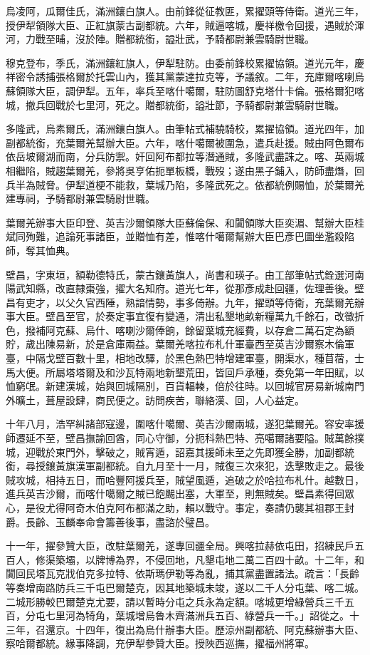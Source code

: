 \begin{pinyinscope}
烏凌阿，瓜爾佳氏，滿洲鑲白旗人。由前鋒從征教匪，累擢頭等侍衛。道光三年，授伊犁領隊大臣、正紅旗蒙古副都統。六年，賊逼喀城，慶祥檄令回援，遇賊於渾河，力戰至晡，沒於陣。贈都統銜，謚壯武，予騎都尉兼雲騎尉世職。

穆克登布，季氏，滿洲鑲紅旗人，伊犁駐防。由委前鋒校累擢協領。道光元年，慶祥密令誘捕張格爾於托雲山內，獲其黨蒙達拉克等，予議敘。二年，充庫爾喀喇烏蘇領隊大臣，調伊犁。五年，率兵至喀什噶爾，駐防圖舒克塔什卡倫。張格爾犯喀城，撤兵回戰於七里河，死之。贈都統銜，謚壯節，予騎都尉兼雲騎尉世職。

多隆武，烏素爾氏，滿洲鑲白旗人。由筆帖式補驍騎校，累擢協領。道光四年，加副都統銜，充葉爾羌幫辦大臣。六年，喀什噶爾被圍急，遣兵赴援。賊由阿色爾布依岳坡爾湖而南，分兵防禦。奸回阿布都拉等潛通賊，多隆武盡誅之。喀、英兩城相繼陷，賊趨葉爾羌，參將吳亨佑扼單板橋，戰歿；遂由黑子鋪入，防師盡熸，回兵半為賊脅。伊犁道梗不能救，葉城乃陷，多隆武死之。依都統例賜恤，於葉爾羌建專祠，予騎都尉兼雲騎尉世職。

葉爾羌辦事大臣印登、英吉沙爾領隊大臣蘇倫保、和闐領隊大臣奕湄、幫辦大臣桂斌同殉難，追論死事諸臣，並贈恤有差，惟喀什噶爾幫辦大臣巴彥巴圖坐濫殺陷師，奪其恤典。

壁昌，字東垣，額勒德特氏，蒙古鑲黃旗人，尚書和瑛子。由工部筆帖式銓選河南陽武知縣，改直隸棗強，擢大名知府。道光七年，從那彥成赴回疆，佐理善後。壁昌有吏才，以父久官西陲，熟諳情勢，事多倚辦。九年，擢頭等侍衛，充葉爾羌辦事大臣。壁昌至官，於奏定事宜復有變通，清出私墾地畝新糧萬九千餘石，改徵折色，撥補阿克蘇、烏什、喀喇沙爾俸餉，餘留葉城充經費，以存倉二萬石定為額貯，歲出陳易新，於是倉庫兩益。葉爾羌喀拉布札什軍臺西至英吉沙爾察木倫軍臺，中隔戈壁百數十里，相地改驛，於黑色熱巴特增建軍臺，開渠水，種苜蓿，士馬大便。所屬塔塔爾及和沙瓦特兩地新墾荒田，皆回戶承種，奏免第一年田賦，以恤窮氓。新建漢城，始與回城隔別，百貨輻輳，倍於往時。以回城官房易新城南門外曠土，葺屋設肆，商民便之。訪問疾苦，聯絡漢、回，人心益定。

十年八月，浩罕糾諸部寇邊，圍喀什噶爾、英吉沙爾兩城，遂犯葉爾羌。容安率援師遷延不至，壁昌撫諭回酋，同心守御，分扼科熱巴特、亮噶爾諸要隘。賊萬餘撲城，迎戰於東門外，擊破之，賊宵遁，詔嘉其援師未至之先即獲全勝，加副都統銜，尋授鑲黃旗漢軍副都統。自九月至十一月，賊復三次來犯，迭擊敗走之。最後賊攻城，相持五日，而哈豐阿援兵至，賊望風遁，追破之於哈拉布札什。越數日，進兵英吉沙爾，而喀什噶爾之賊已飽颺出塞，大軍至，則無賊矣。壁昌素得回眾心，是役尤得阿奇木伯克阿布都滿之助，賴以戰守。事定，奏請仍襲其祖郡王封爵。長齡、玉麟奉命會籌善後事，盡諮於璧昌。

十一年，擢參贊大臣，改駐葉爾羌，遂專回疆全局。興喀拉赫依屯田，招練民戶五百人，修渠築壩，以牌博為界，不侵回地，凡墾屯地二萬二百四十畝。十二年，和闐回民塔瓦克戕伯克多拉特、依斯瑪伊勒等為亂，捕其黨盡置諸法。疏言：「長齡等奏增南路防兵三千屯巴爾楚克，因其地築城未竣，遂以二千人分屯葉、喀二城。二城形勝較巴爾楚克尤要，請以暫時分屯之兵永為定額。喀城更增綠營兵三千五百，分屯七里河為犄角，葉城增烏魯木齊滿洲兵五百、綠營兵一千。」詔從之。十三年，召還京。十四年，復出為烏什辦事大臣。歷涼州副都統、阿克蘇辦事大臣、察哈爾都統。緣事降調，充伊犁參贊大臣。授陜西巡撫，擢福州將軍。


\end{pinyinscope}
